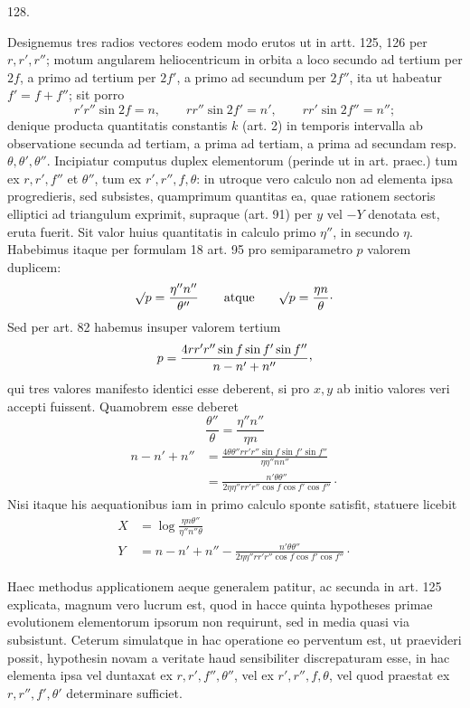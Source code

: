 \par{}\medskip
\begin{center}\hypertarget{native-174-article128}{}128.\end{center}
Designemus tres radios vectores eodem modo erutos ut in artt. 125, 126
per $r,r',r''$; motum angularem heliocentricum in orbita a loco secundo ad
tertium per $2f$, a primo ad tertium per $2f'$, a primo ad secundum per $2f''$,
ita ut habeatur $f'=f+f''$; sit porro
\[
r'r''\sin2f=n,\qquad rr''\sin2f'=n',\qquad rr'\sin2f''=n'';
\]
denique producta quantitatis constantis $k$ (art. 2) in temporis intervalla ab
observatione secunda ad tertiam, a prima ad tertiam, a prima ad secundam
resp. $\theta,\theta',\theta''$. Incipiatur computus duplex elementorum (perinde ut in art.
praec.) tum ex $r,r',f''$ et $\theta''$, tum ex $r',r'',f,\theta$: in utroque vero calculo non
ad elementa ipsa progredieris, sed subsistes, quamprimum quantitas ea, quae
rationem sectoris elliptici ad triangulum exprimit, supraque (art. 91) per $y$ vel
$-Y$ denotata est, eruta fuerit. Sit valor huius quantitatis in calculo primo
$\eta''$, in secundo $\eta$. Habebimus itaque per formulam 18 art. 95 pro semiparametro
$p$ valorem duplicem:
\[
\mathord{{}^{}\!\surd}p=\frac{\eta''n''}{\theta''}\qquad\text{atque}\qquad
\mathord{{}^{}\!\surd}p=\frac{\eta n}{\theta}\mathpunct{\cdot}
\]
Sed per art. 82 habemus insuper valorem tertium
\[
p=\frac{4rr'r''\sin f\sin f'\sin f''}{n-n'+n''}\mathpunct{\raisebox{.45ex}{,}}
\]
qui tres valores manifesto identici esse deberent, si pro $x,y$ ab initio valores
veri accepti fuissent. Quamobrem esse deberet
\[
\frac{\theta''}{\theta}=\frac{\eta''n''}{\eta n}
\]
\[
\begin{aligned}
n-n'+n''&=\frac{4\theta\theta''rr'r''\sin f\sin f'\sin f''}{\eta\eta''nn''}\\[5pt]
&=\frac{n'\theta\theta''}{2\eta\eta''rr'r''\cos f\cos f'\cos f''}\mathpunct{\cdot}
\end{aligned}
\]
Nisi itaque his aequationibus iam in primo calculo sponte satisfit, statuere
licebit
\[
\begin{aligned}
X&=\log\frac{\eta n\theta''}{\eta''n''\theta}\\[5pt]
Y&=n-n'+n''-\frac{n'\theta\theta''}{2\eta\eta''rr'r''\cos f\cos f'\cos f''}\mathpunct{\cdot}
\end{aligned}
\]

Haec methodus applicationem aeque generalem patitur, ac secunda in
art. 125 explicata, magnum vero lucrum est, quod in hacce quinta hypotheses
primae evolutionem elementorum ipsorum non requirunt, sed in media quasi
via subsistunt. Ceterum simulatque in hac operatione eo perventum est, ut
praevideri possit, hypothesin novam a veritate haud sensibiliter discrepaturam
esse, in hac elementa ipsa vel duntaxat ex $r,r',f'',\theta''$, vel ex $r',r'',f,\theta$, vel
quod praestat ex $r,r'',f',\theta'$ determinare sufficiet.
